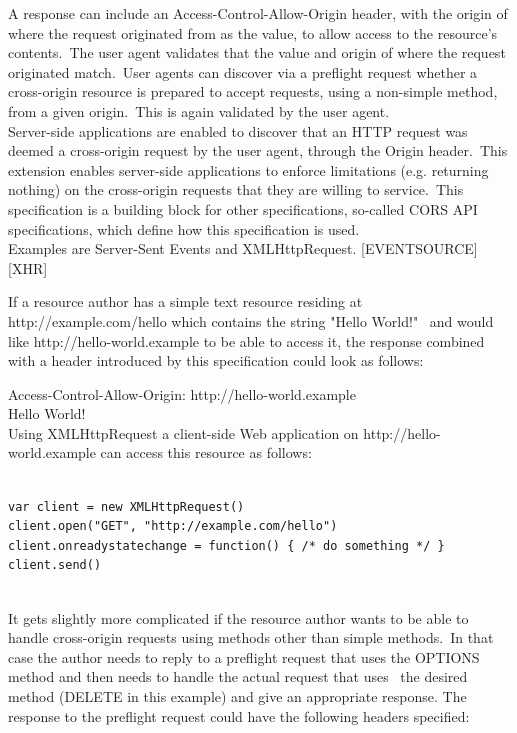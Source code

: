 A response can include an Access-Control-Allow-Origin header, with the origin of where the request originated from as the value, to allow access to the resource's contents.\
The user agent validates that the value and origin of where the request originated match.\
User agents can discover via a preflight request whether a cross-origin resource is prepared to accept requests, using a non-simple method, from a given origin.\
This is again validated by the user agent.\\

Server-side applications are enabled to discover that an HTTP request was deemed a cross-origin request by the user agent, through the Origin header.\
This extension enables server-side applications to enforce limitations (e.g. returning nothing) on the cross-origin requests that they are willing to service.\
This specification is a building block for other specifications, so-called CORS API specifications, which define how this specification is used.\\
Examples are Server-Sent Events and XMLHttpRequest. [EVENTSOURCE] [XHR]

If a resource author has a simple text resource residing at http://example.com/hello which contains the string "Hello World!" \
and would like http://hello-world.example to be able to access it, the response combined with a header introduced by this specification could look as follows:\

Access-Control-Allow-Origin: http://hello-world.example\\

Hello World!\\

Using XMLHttpRequest a client-side Web application on http://hello-world.example can access this resource as follows:\\
\begin{verbatim}

var client = new XMLHttpRequest()
client.open("GET", "http://example.com/hello")
client.onreadystatechange = function() { /* do something */ }
client.send()
 
\end{verbatim}

It gets slightly more complicated if the resource author wants to be able to handle cross-origin requests using methods other than simple methods.\
In that case the author needs to reply to a preflight request that uses the OPTIONS method and then needs to handle the actual request that uses \
the desired method (DELETE in this example) and give an appropriate response. The response to the preflight request could have the following headers specified:\\

